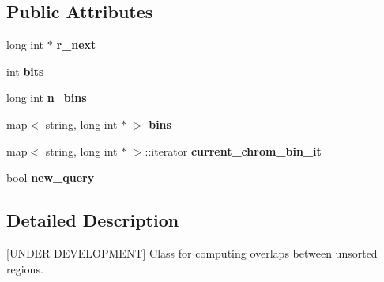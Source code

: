 \subsection*{Public Attributes}
\begin{CompactItemize}
\item 
\hypertarget{classUnsortedGenomicRegionSetOverlaps_251e09b7f0a13a56b902c30791228ce4}{
long int $\ast$ \textbf{r\_\-next}}
\label{classUnsortedGenomicRegionSetOverlaps_251e09b7f0a13a56b902c30791228ce4}

\item 
\hypertarget{classUnsortedGenomicRegionSetOverlaps_cc20802c33275e85febcf6cfe131d466}{
int \textbf{bits}}
\label{classUnsortedGenomicRegionSetOverlaps_cc20802c33275e85febcf6cfe131d466}

\item 
\hypertarget{classUnsortedGenomicRegionSetOverlaps_63597afa782412cc2b4c609afe90bb82}{
long int \textbf{n\_\-bins}}
\label{classUnsortedGenomicRegionSetOverlaps_63597afa782412cc2b4c609afe90bb82}

\item 
\hypertarget{classUnsortedGenomicRegionSetOverlaps_c10739a61d7f7c3057fe2e5445570822}{
map$<$ string, long int $\ast$ $>$ \textbf{bins}}
\label{classUnsortedGenomicRegionSetOverlaps_c10739a61d7f7c3057fe2e5445570822}

\item 
\hypertarget{classUnsortedGenomicRegionSetOverlaps_d21d098f71b0929fb4a770c8e4685038}{
map$<$ string, long int $\ast$ $>$::iterator \textbf{current\_\-chrom\_\-bin\_\-it}}
\label{classUnsortedGenomicRegionSetOverlaps_d21d098f71b0929fb4a770c8e4685038}

\item 
\hypertarget{classUnsortedGenomicRegionSetOverlaps_bafc544ce2c677ce071fa4e30ec2ecaf}{
bool \textbf{new\_\-query}}
\label{classUnsortedGenomicRegionSetOverlaps_bafc544ce2c677ce071fa4e30ec2ecaf}

\end{CompactItemize}


\subsection{Detailed Description}
\mbox{[}UNDER DEVELOPMENT\mbox{]} Class for computing overlaps between unsorted regions. 

